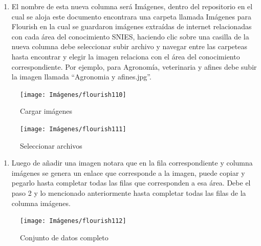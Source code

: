 \documentclass[
]{book}
\providecommand{\tightlist}{%
  \setlength{\itemsep}{0pt}\setlength{\parskip}{0pt}}
\begin{document}
\begin{enumerate}
\def\labelenumi{\arabic{enumi}.}
\setcounter{enumi}{1}
\tightlist
\item
  El nombre de esta nueva columna será Imágenes, dentro del repositorio en el cual se aloja este documento encontrara una carpeta llamada Imágenes para Flourish en la cual se guardaron imágenes extraídas de internet relacionadas con cada área del conocimiento SNIES, haciendo clic sobre una casilla de la nueva columna debe seleccionar subir archivo y navegar entre las carpeteas hasta encontrar y elegir la imagen relaciona con el área del conocimiento correspondiente. Por ejemplo, para Agronomía, veterinaria y afines debe subir la imagen llamada ``Agronomia y afines.jpg''.
\end{enumerate}

\begin{figure}

{\centering \texttt{[image: Imágenes/flourish110]} 

}

\caption{Cargar imágenes}\label{fig:paso2carrerabarrasflourish-fig}
\end{figure}

\begin{figure}

{\centering \texttt{[image: Imágenes/flourish111]} 

}

\caption{Seleccionar archivos}\label{fig:paso22carrerabarrasflourish-fig}
\end{figure}

\begin{enumerate}
\def\labelenumi{\arabic{enumi}.}
\setcounter{enumi}{2}
\tightlist
\item
  Luego de añadir una imagen notara que en la fila correspondiente y columna imágenes se genera un enlace que corresponde a la imagen, puede copiar y pegarlo hasta completar todas las filas que corresponden a esa área. Debe el paso 2 y lo mencionado anteriormente hasta completar todas las filas de la columna imágenes.
\end{enumerate}

\begin{figure}

{\centering \texttt{[image: Imágenes/flourish112]} 

}

\caption{Conjunto de datos completo}\label{fig:paso3carrerabarrasflourish-fig}
\end{figure}
\end{document}
